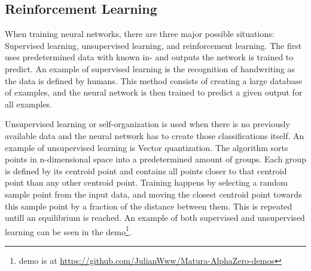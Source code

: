\documentclass[12pt]{article}
\begin{document}
\subsection{Reinforcement Learning}
When training neural networks, there are three major possible situations: Supervised learning, unsupervised learning, and reinforcement learning. The first uses predetermined data with known in- and outputs the network is trained to predict. An example of supervised learning is the recognition of handwriting as the data is defined by humans. This method consists of creating a large database of examples, and the neural network is then trained to predict a given output for all examples. 

Unsupervised learning or self-organization is used when there is no previously available data and the neural network has to create those classifications itself. An example of unsupervised learning is Vector quantization. The algorithm sorts points in n-dimensional space into a predetermined amount of groups. Each group is defined by its centroid point and contains all points closer to that centroid point than any other centroid point. Training happens by selecting a random sample point from the input data, and moving the closest centroid point towards this sample point by a fraction of the distance between them.\cite{wiki:Vector_quantization} This is repeated untill an equilibrium is reached. An example of both supervised and unsupervised learning can be seen in the demo\footnote{demo is at \url{https://github.com/JulianWww/Matura-AlphaZero-demos}}.
\end{document}

